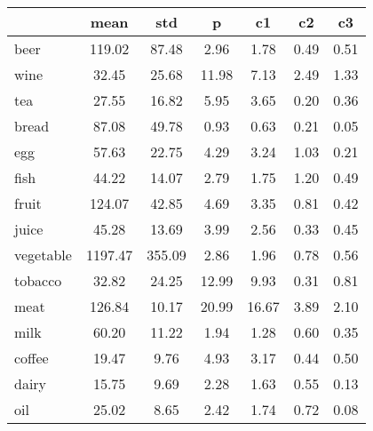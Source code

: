 \documentclass[
]{article}
\begin{document}
\begin{tabular}{lcccccc}
\toprule
  & mean & std & p & c1 & c2 & c3\\
\midrule
beer & 119.02 & 87.48 & 2.96 & 1.78 & 0.49 & 0.51\\
wine & 32.45 & 25.68 & 11.98 & 7.13 & 2.49 & 1.33\\
tea & 27.55 & 16.82 & 5.95 & 3.65 & 0.20 & 0.36\\
bread & 87.08 & 49.78 & 0.93 & 0.63 & 0.21 & 0.05\\
egg & 57.63 & 22.75 & 4.29 & 3.24 & 1.03 & 0.21\\
\addlinespace
fish & 44.22 & 14.07 & 2.79 & 1.75 & 1.20 & 0.49\\
fruit & 124.07 & 42.85 & 4.69 & 3.35 & 0.81 & 0.42\\
juice & 45.28 & 13.69 & 3.99 & 2.56 & 0.33 & 0.45\\
vegetable & 1197.47 & 355.09 & 2.86 & 1.96 & 0.78 & 0.56\\
tobacco & 32.82 & 24.25 & 12.99 & 9.93 & 0.31 & 0.81\\
\addlinespace
meat & 126.84 & 10.17 & 20.99 & 16.67 & 3.89 & 2.10\\
milk & 60.20 & 11.22 & 1.94 & 1.28 & 0.60 & 0.35\\
coffee & 19.47 & 9.76 & 4.93 & 3.17 & 0.44 & 0.50\\
dairy & 15.75 & 9.69 & 2.28 & 1.63 & 0.55 & 0.13\\
oil & 25.02 & 8.65 & 2.42 & 1.74 & 0.72 & 0.08\\
\bottomrule
\end{tabular}

\begin{table}[H]
\centering
{}
\end{table}
\end{document}
